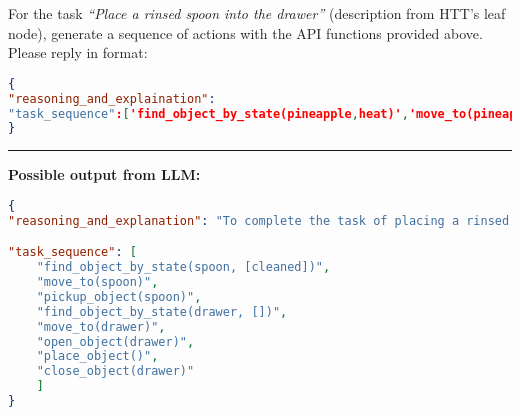 \documentclass{article}
\begin{document}
For the task  \textit{``Place a rinsed spoon into the drawer''} {\color{blue} (description from HTT's leaf node)}, generate a sequence of actions with the API functions provided above. Please reply in format:
\begin{lstlisting}[language=json]
{
"reasoning_and_explaination":    
"task_sequence":['find_object_by_state(pineapple,heat)','move_to(pineapple)'](the splittd task sequence),
}
\end{lstlisting}

\noindent\rule{16cm}{0.4pt}

\textbf{Possible output from LLM:}
\begin{lstlisting}[language=json]
{
"reasoning_and_explanation": "To complete the task of placing a rinsed spoon into the drawer, the robot must first locate a spoon that has been rinsed (assuming 'rinsed' is a state similar to 'cleaned'). After finding the spoon, the robot needs to move to the location of the spoon to pick it up. Once the spoon is in the robot's possession, the robot must locate a drawer, move to it, and then open the drawer to place the spoon inside. Finally, the robot should close the drawer to complete the task.",

"task_sequence": [
    "find_object_by_state(spoon, [cleaned])",
    "move_to(spoon)",
    "pickup_object(spoon)",
    "find_object_by_state(drawer, [])",
    "move_to(drawer)",
    "open_object(drawer)",
    "place_object()",
    "close_object(drawer)"  
    ]
}
\end{lstlisting}
\end{document}
